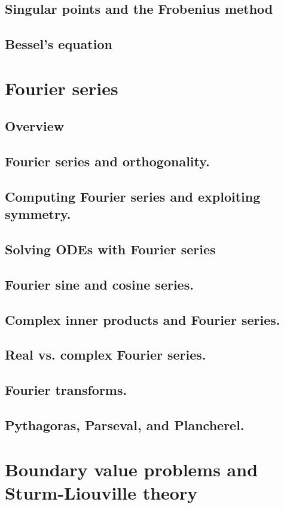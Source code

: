\documentclass{article}
\begin{document}
\subsection{Singular points and the Frobenius method}
\subsection{Bessel's equation}
\pagebreak
\section{Fourier series}
\subsection*{Overview}
\subsection{Fourier series and orthogonality.}
\subsection{Computing Fourier series and exploiting symmetry.}
\subsection{Solving ODEs with Fourier series}
\subsection{Fourier sine and cosine series.}
\subsection{Complex inner products and Fourier series.}
\subsection{Real vs. complex Fourier series.}
\subsection{Fourier transforms.}
\subsection{Pythagoras, Parseval, and Plancherel.}
\pagebreak
\section{Boundary value problems and Sturm-Liouville theory}
\end{document}
